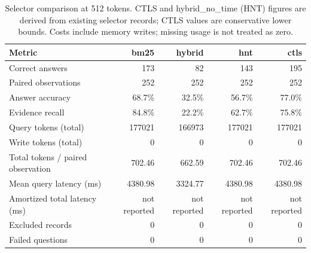 \begin{table}[htbp]
\centering
\small
\caption{Selector comparison at 512 tokens. CTLS and hybrid\_no\_time (HNT) figures are derived from existing selector records; CTLS values are conservative lower bounds. Costs include memory writes; missing usage is not treated as zero.}
\label{tab:fair_baselines_512}
\begin{tabular}{lrrrr}
\toprule
Metric & bm25 & hybrid & hnt & ctls \\
\midrule
Correct answers & 173 & 82 & 143 & 195 \\
Paired observations & 252 & 252 & 252 & 252 \\
Answer accuracy & 68.7\% & 32.5\% & 56.7\% & 77.0\% \\
Evidence recall & 84.8\% & 22.2\% & 62.7\% & 75.8\% \\
Query tokens (total) & 177021 & 166973 & 177021 & 177021 \\
Write tokens (total) & 0 & 0 & 0 & 0 \\
Total tokens / paired observation & 702.46 & 662.59 & 702.46 & 702.46 \\
Mean query latency (ms) & 4380.98 & 3324.77 & 4380.98 & 4380.98 \\
Amortized total latency (ms) & not reported & not reported & not reported & not reported \\
Excluded records & 0 & 0 & 0 & 0 \\
Failed questions & 0 & 0 & 0 & 0 \\
\bottomrule
\end{tabular}
\end{table}


